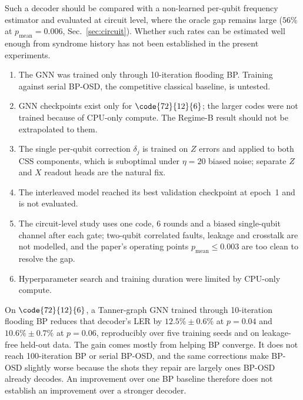 Such a decoder should be compared with a non-learned per-qubit frequency
estimator and evaluated at circuit level, where the oracle gap remains
large ($56\%$ at $p_\mathrm{mean}=0.006$, Sec.~\ref{sec:circuit}).
Whether such rates can be estimated well enough from syndrome history has
not been established in the present experiments.

\begin{enumerate}[leftmargin=*,topsep=3pt,itemsep=2pt,label=(\roman*)]
\item The GNN was trained only through 10-iteration flooding BP. Training
      against serial BP-OSD, the competitive classical baseline, is untested.
\item GNN checkpoints exist only for $\code{72}{12}{6}$; the larger codes
      were not trained because of CPU-only compute. The Regime-B result
      should not be extrapolated to them.
\item The single per-qubit correction $\delta_j$ is trained on $Z$ errors
      and applied to both CSS components, which is suboptimal under
      $\eta=20$ biased noise; separate $Z$ and $X$ readout heads are the
      natural fix.
\item The interleaved model reached its best validation checkpoint at
      epoch~1 and is not evaluated.
\item The circuit-level study uses one code, 6 rounds and a biased
      single-qubit channel after each gate; two-qubit correlated faults,
      leakage and crosstalk are not modelled, and the paper's operating
      points $p_\mathrm{mean}\le0.003$ are too clean to resolve the gap.
\item Hyperparameter search and training duration were limited by CPU-only
      compute.
\end{enumerate}

On $\code{72}{12}{6}$, a Tanner-graph GNN trained through 10-iteration
flooding BP reduces that decoder's LER by $12.5\%\pm0.6\%$ at $p=0.04$
and $10.6\%\pm0.7\%$ at $p=0.06$, reproducibly over five training seeds
and on leakage-free held-out data. The gain comes mostly from helping BP
converge. It does not reach 100-iteration BP or serial BP-OSD, and the
same corrections make BP-OSD slightly worse because the shots they repair
are largely ones BP-OSD already decodes. An improvement over one BP
baseline therefore does not establish an improvement over a stronger
decoder.

